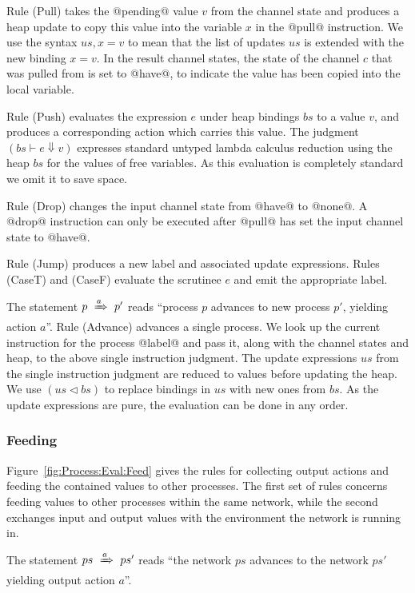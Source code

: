 Rule (Pull) takes the @pending@ value $v$ from the channel state and produces a heap update to copy this value into the variable $x$ in the @pull@ instruction. We use the syntax $us,x=v$ to mean that the list of updates $us$ is extended with the new binding $x=v$. In the result channel states, the state of the channel $c$ that was pulled from is set to @have@, to indicate the value has been copied into the local variable.

Rule (Push) evaluates the expression $e$ under heap bindings $bs$ to a value $v$, and produces a corresponding action which carries this value. The judgment $(bs \vdash e \Downarrow v)$ expresses standard untyped lambda calculus reduction using the heap $bs$ for the values of free variables. As this evaluation is completely standard we omit it to save space.

Rule (Drop) changes the input channel state from @have@ to @none@. A @drop@ instruction can only be executed after @pull@ has set the input channel state to @have@. 

Rule (Jump) produces a new label and associated update expressions. Rules (CaseT) and (CaseF) evaluate the scrutinee $e$ and emit the appropriate label.

The statement $p~\xRightarrow{a}~p'$ reads ``process $p$ advances to new process $p'$, yielding action $a$''. Rule (Advance) advances a single process. We look up the current instruction for the process @label@ and pass it, along with the channel states and heap, to the above single instruction judgment. The update expressions $us$ from the single instruction judgment are reduced to values before updating the heap. We use $(us \lhd bs)$ to replace bindings in $us$ with new ones from $bs$. As the update expressions are pure, the evaluation can be done in any order.


\subsubsection{Feeding}
Figure~\ref{fig:Process:Eval:Feed} gives the rules for collecting output actions and feeding the contained values to other processes. The first set of rules concerns feeding values to other processes within the same network, while the second exchanges input and output values with the environment the network is running in.

The statement $ps~\xRightarrow{a}~ps'$ reads ``the network $ps$ advances to the network $ps'$ yielding output action $a$''.

